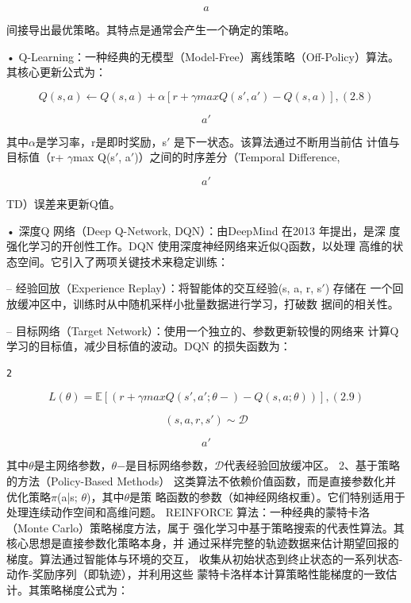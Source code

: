 \documentclass[12pt,a4paper,openright,UTF8]{ctexbook}
\begin{document}
\begin{equation*}
a
\end{equation*}

间接导出最优策略。其特点是通常会产生一个确定的策略。

• Q-Learning：一种经典的无模型（Model-Free）离线策略（Off-Policy）算法。
其核心更新公式为：

\begin{equation*}
Q(s, a) \leftarrow Q(s, a) + \alpha[r+ \gamma max Q(s', a') −Q(s, a)],(2.8)
\end{equation*}

\begin{equation*}
a'
\end{equation*}

其中$\alpha$是学习率，r是即时奖励，s$'$ 是下一状态。该算法通过不断用当前估 计值与目标值（r+ $\gamma$max Q(s$'$, a$'$)）之间的时序差分（Temporal Difference,

\begin{equation*}
a'
\end{equation*}

TD）误差来更新Q值。

• 深度Q 网络（Deep Q-Network, DQN）：由DeepMind 在2013 年提出，是深
度强化学习的开创性工作。DQN 使用深度神经网络来近似Q函数，以处理 高维的状态空间。它引入了两项关键技术来稳定训练：

– 经验回放（Experience Replay）：将智能体的交互经验(s, a, r, s$'$) 存储在
一个回放缓冲区中，训练时从中随机采样小批量数据进行学习，打破数 据间的相关性。

– 目标网络（Target Network）：使用一个独立的、参数更新较慢的网络来
计算Q 学习的目标值，减少目标值的波动。DQN 的损失函数为：

\begin{lstlisting}
2
\end{lstlisting}

\begin{equation*}
L(\theta) = \mathbb{E}[(r+ \gamma max Q(s', a'; \theta−) −Q(s, a; \theta))],(2.9)
\end{equation*}

\begin{equation*}
(s,a,r,s')\sim\mathcal{D}
\end{equation*}

\begin{equation*}
a'
\end{equation*}

其中$\theta$是主网络参数，$\theta$−是目标网络参数，$\mathcal{D}$代表经验回放缓冲区。 2、基于策略的方法（Policy-Based Methods） 这类算法不依赖价值函数，而是直接参数化并优化策略$\pi$(a|s; $\theta$)，其中$\theta$是策 略函数的参数（如神经网络权重）。它们特别适用于处理连续动作空间和高维问题。 REINFORCE 算法：一种经典的蒙特卡洛（Monte Carlo）策略梯度方法，属于 强化学习中基于策略搜索的代表性算法。其核心思想是直接参数化策略本身，并 通过采样完整的轨迹数据来估计期望回报的梯度。算法通过智能体与环境的交互， 收集从初始状态到终止状态的一系列状态-动作-奖励序列（即轨迹），并利用这些 蒙特卡洛样本计算策略性能梯度的一致估计。其策略梯度公式为：
\end{document}
